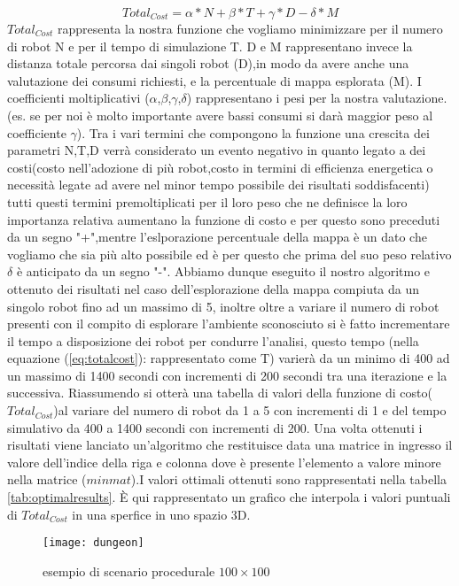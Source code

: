 \begin{equation}
\label{eq:totalcost}
Total_{Cost} = \alpha*N +\beta*T + \gamma*D - \delta*M
\end{equation}
$Total_{Cost}$ rappresenta la nostra funzione che vogliamo minimizzare per il numero di robot N e per il tempo di simulazione T. D e M rappresentano invece la distanza totale percorsa dai singoli robot (D),in modo da avere anche una valutazione dei consumi richiesti, e la percentuale di mappa esplorata (M). I coefficienti moltiplicativi ($ \alpha $,$ \beta $,$ \gamma $,$ \delta $) rappresentano i pesi per la nostra valutazione.(es. se per noi è molto importante avere bassi consumi si darà maggior peso al coefficiente $\gamma$). Tra i vari termini che compongono la funzione una crescita dei parametri N,T,D verrà considerato un evento negativo in quanto legato a dei costi(costo nell'adozione di più robot,costo in termini di efficienza energetica o necessità legate ad avere nel minor tempo possibile dei risultati soddisfacenti)  tutti questi termini premoltiplicati per il loro peso che ne definisce la loro importanza relativa aumentano la funzione di costo e per questo sono preceduti da un segno "+",mentre l'eslporazione percentuale della mappa è un dato che vogliamo che sia più alto possibile ed è per questo che prima del suo peso relativo $\delta $ è anticipato da un segno "-".
Abbiamo dunque eseguito il nostro algoritmo e ottenuto dei risultati nel caso dell'esplorazione della mappa compiuta da un singolo robot fino ad un massimo di 5, inoltre oltre a variare il numero di robot presenti con il compito di esplorare l'ambiente sconosciuto si è fatto incrementare il tempo a disposizione dei robot per condurre l'analisi, questo tempo (nella  equazione (\ref{eq:totalcost}):  rappresentato come T) varierà da un minimo di 400 ad un massimo di 1400 secondi con incrementi di 200 secondi tra una iterazione e la successiva. Riassumendo si otterà una tabella di valori della funzione di costo($Total_{Cost}$)al variare del numero di robot da 1 a 5 con incrementi di 1 e del tempo simulativo da 400 a 1400 secondi con incrementi di 200. Una volta ottenuti i risultati viene lanciato un'algoritmo che restituisce data una matrice in ingresso il valore dell'indice della riga e colonna dove è presente l'elemento a valore minore nella matrice ($minmat$).I valori ottimali ottenuti sono rappresentati nella tabella  \ref{tab:optimalresults}.
È qui rappresentato un grafico che interpola i valori puntuali di $Total_{Cost}$ in una sperfice in uno spazio 3D.
\begin{figure}[!htb]
\centering
\texttt{[image: dungeon]}
\caption{esempio di scenario procedurale $100\times100$}
\label{fig:dungeon}
\end{figure}

